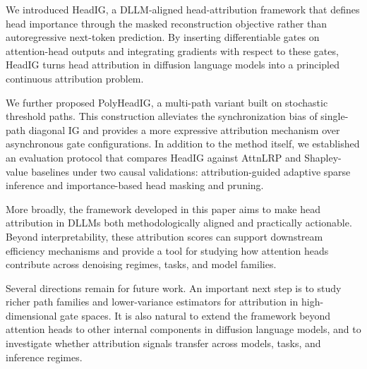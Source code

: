 We introduced HeadIG, a DLLM-aligned head-attribution framework that defines head importance through the masked reconstruction objective rather than autoregressive next-token prediction. By inserting differentiable gates on attention-head outputs and integrating gradients with respect to these gates, HeadIG turns head attribution in diffusion language models into a principled continuous attribution problem.

We further proposed PolyHeadIG, a multi-path variant built on stochastic threshold paths. This construction alleviates the synchronization bias of single-path diagonal IG and provides a more expressive attribution mechanism over asynchronous gate configurations. In addition to the method itself, we established an evaluation protocol that compares HeadIG against AttnLRP and Shapley-value baselines under two causal validations: attribution-guided adaptive sparse inference and importance-based head masking and pruning.

More broadly, the framework developed in this paper aims to make head attribution in DLLMs both methodologically aligned and practically actionable. Beyond interpretability, these attribution scores can support downstream efficiency mechanisms and provide a tool for studying how attention heads contribute across denoising regimes, tasks, and model families.

Several directions remain for future work. An important next step is to study richer path families and lower-variance estimators for attribution in high-dimensional gate spaces. It is also natural to extend the framework beyond attention heads to other internal components in diffusion language models, and to investigate whether attribution signals transfer across models, tasks, and inference regimes.
